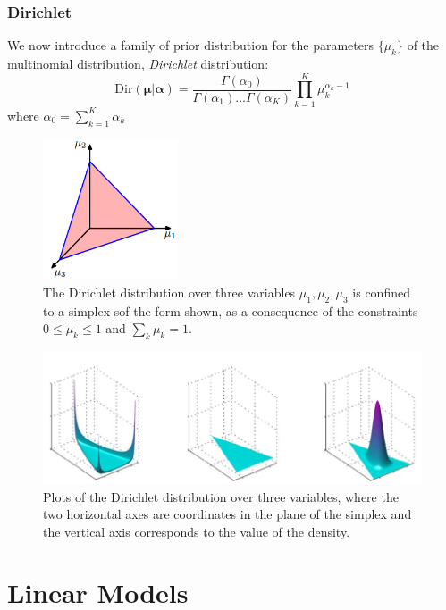 \documentclass[a3paper, 12pt]{book} %
\begin{document}
\subsection{Dirichlet}
We now introduce a family of prior distribution for the parameters $\{\mu_k\}$ of the multinomial distribution, \emph{Dirichlet} distribution:
\begin{equation}
\mathrm{Dir}{(\boldsymbol{\mu}|\boldsymbol{\alpha})}=\frac{\Gamma{(\alpha_0)}}{\Gamma{(\alpha_1)}...\Gamma{(\alpha_K)}}\prod_{k=1}^{K}{\mu_{k}^{\alpha_k-1}}
\end{equation}
where $\alpha_0=\sum_{k=1}^{K}\alpha_k$
\begin{figure}[htpb]
	\centering
	\includegraphics[width=4cm]{figures/dirichlet_simplex.png}
	\caption{The Dirichlet distribution over three variables $\mu_1, \mu_2, \mu_3$
		is confined to a simplex sof
the form shown, as a consequence of the constraints
$0\le \mu_k \le 1$ and $\sum_k{\mu_k} = 1$.}
	\label{fig:boat1}
\end{figure}
\begin{figure}[htpb]
	\centering
	\includegraphics[width=\linewidth]{figures/dirichlet_dist.png}
	\caption{Plots of the Dirichlet distribution over three variables, where the two horizontal axes are coordinates
in the plane of the simplex and the vertical axis corresponds to the value of the density.}
	\label{fig:boat1}
\end{figure}


\chapter{Linear Models}
\end{document}
